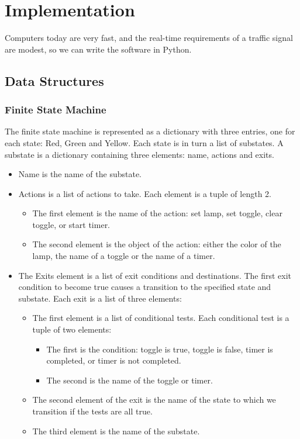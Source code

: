 \documentclass[letterpaper,twoside]{article}
\begin{document}
\section{Implementation}

Computers today are very fast, and the real-time requirements of a traffic
signal are modest, so we can write the software in Python.

\subsection{Data Structures}

\subsubsection{Finite State Machine}

The finite state machine is represented as a dictionary with three entries,
one for each state: Red, Green and Yellow.
Each state is in turn a list of substates.
A substate is a dictionary containing three elements: name, actions and exits.
\begin{itemize}
\item{Name is the name of the substate.}
\item{Actions is a list of actions to take.
  Each element is a tuple of length 2.}
  \begin{itemize}
    \item{The first element is the name of the action: set lamp, set toggle,
      clear toggle, or start timer.}
      \item{The second element is the object of the action: either
        the color of the lamp, the name of a toggle or the name of a timer.}
  \end{itemize}

\item{The Exits element is a list of exit conditions and destinations.
  The first exit condition to become true causes a transition to
  the specified state and substate.
  Each exit is a list of three elements:}
  \begin{itemize}
  \item{The first element is a list of conditional tests.
    Each conditional test is a tuple of two elements:}
    \begin{itemize}
    \item{The first is the condition: toggle is true, toggle is false, 
      timer is completed, or timer is not completed.}
    \item{The second is the name of the toggle or timer.}
    \end{itemize}
  \item{The second element of the exit is the name of the state
    to which we transition if the tests are all true.}
  \item{The third element is the name of the substate.}
  \end{itemize}
\end{itemize}
\end{document}
